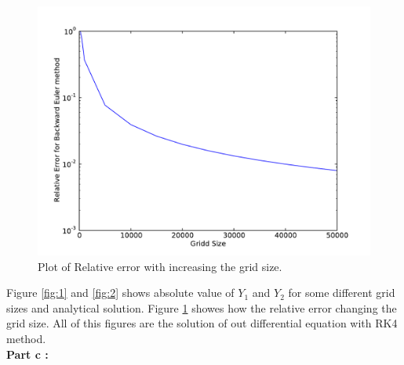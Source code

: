 \documentclass[10pt]{article}
\begin{document}
\begin{figure}[hbt]
 \centering
 \label{fig:3} \includegraphics[scale=0.4]{Plots/plot3.pdf}
 \caption{ Plot of Relative error with increasing the grid size.}
\end{figure}


Figure \ref{fig:1} and \ref{fig:2} shows absolute value of $Y_1$ and $Y_2$ for some different grid sizes and analytical solution. Figure \ref{fig:3} showes how the relative error changing the grid size. All of this figures are the solution of out differential equation with RK4 method. \\


\bfseries{Part c :}\\ \mdseries
\end{document}
